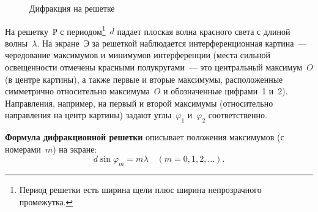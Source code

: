 \documentclass[main.tex]{subfiles}
\begin{document}
\begin{figure}[H]
\caption{Дифракция на решетке}
\label{fig:p193}
\end{figure}

На решетку~Р с периодом\footnote{Период решетки есть ширина щели плюс ширина непрозрачного промежутка.}~$d$ падает плоская волна красного света с длиной волны~$\lambda$. На экране~Э за решеткой наблюдается интерференционная картина~--- чередование максимумов и минимумов интерференции (места сильной освещенности отмечены красными полукругами~--- это центральный максимум~$O$ (в центре картины), а также первые и вторые максимумы, расположенные симметрично относительно максимума~$O$ и обозначенные цифрами~1 и~2). Направления, например, на первый и второй максимумы (относительно направления на центр картины) задают углы~$\varphi_1$ и~$\varphi_2$ соответственно.  

\textbf{Формула дифракционной решетки} описывает положения максимумов (с номерами~$m$) на экране:
\begin{equation}
    d\sin\varphi_m=m\lambda\quad(m=0,1,2,\ldots).
\end{equation}








 
\end{document}
